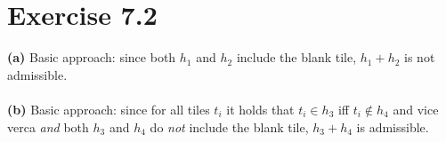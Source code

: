 \documentclass[11pt,a4paper]{article}
\begin{document}
\section*{Exercise 7.2}
\textbf{(a)} Basic approach: since both $h_1$ and $h_2$ include the blank tile, $h_1+h_2$ is not admissible.\\
\\
\textbf{(b)} Basic approach: since for all tiles $t_i$ it holds that $t_i\in h_3$ iff $t_i\not\in h_4$ and vice verca \emph{and} both $h_3$ and $h_4$ do \emph{not} include the blank tile, $h_3+h_4$ is admissible.\\
\\

\label{lastpage}
\end{document}
